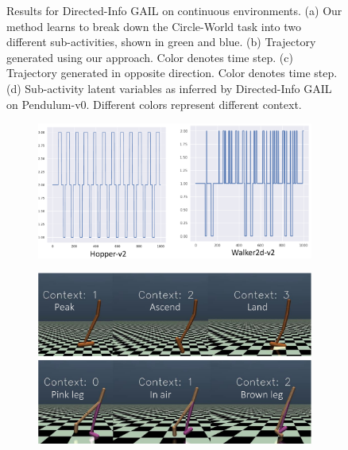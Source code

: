 \documentclass{article} %
\begin{document}
\begin{figure}[t]
\begin{subfigure}{0.24\columnwidth}
    \caption{}
    \end{subfigure}
\caption{Results for Directed-Info GAIL on continuous environments. (a) Our method learns to break down the Circle-World task into two different sub-activities, shown in green and blue. (b) Trajectory generated using our approach. Color denotes time step. (c) Trajectory generated in opposite direction. Color denotes time step. (d) Sub-activity latent variables as inferred by Directed-Info GAIL on Pendulum-v0. Different colors represent different context.}
\label{results_exp2}

\end{figure}


\begin{figure}[tb]
    \centering
    \begin{subfigure}{0.48\columnwidth}
    \centering
    \includegraphics[scale=0.25]{figures/hopper/hopper_walker_subtasks_crop.pdf}
    \caption{}
    \end{subfigure}%
    \centering
    \begin{subfigure}{0.48\columnwidth}
    \centering
    \includegraphics[scale=0.17]{figures/hopper_walker_frames_cropped.pdf}
    \caption{}
    \end{subfigure}%
    

\end{figure}
\end{document}
